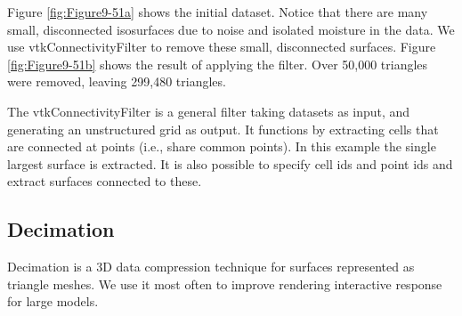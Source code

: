 Figure \ref{fig:Figure9-51a} shows the initial dataset. Notice that there are many small, disconnected isosurfaces due to noise and isolated moisture in the data. We use vtkConnectivityFilter to remove these small, disconnected surfaces. Figure \ref{fig:Figure9-51b} shows the result of applying the filter. Over 50,000 triangles were removed, leaving 299,480 triangles.

The vtkConnectivityFilter is a general filter taking datasets as input, and generating an unstructured grid as output. It functions by extracting cells that are connected at points (i.e., share common points). In this example the single largest surface is extracted. It is also possible to specify cell ids and point ids and extract surfaces connected to these.                   

\subsection{Decimation}

Decimation is a 3D data compression technique for surfaces represented as triangle meshes. We use it most often to improve rendering interactive response for large models.

